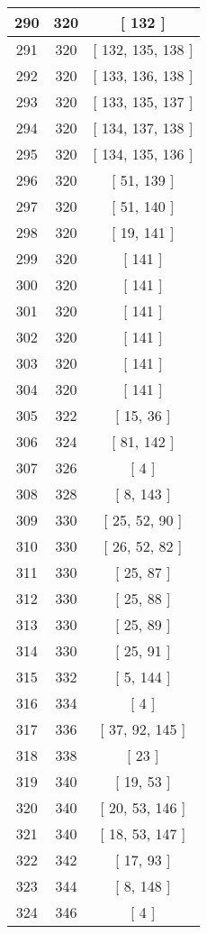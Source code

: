 \begin{center}
\begin{longtable}[H]{|| c c c ||}
\hline
290 & 320 & [ 132 ] \\ 
\hline
291 & 320 & [ 132, 135, 138 ] \\ 
\hline
292 & 320 & [ 133, 136, 138 ] \\ 
\hline
293 & 320 & [ 133, 135, 137 ] \\ 
\hline
294 & 320 & [ 134, 137, 138 ] \\ 
\hline
295 & 320 & [ 134, 135, 136 ] \\ 
\hline
296 & 320 & [ 51, 139 ] \\ 
\hline
297 & 320 & [ 51, 140 ] \\ 
\hline
298 & 320 & [ 19, 141 ] \\ 
\hline
299 & 320 & [ 141 ] \\ 
\hline
300 & 320 & [ 141 ] \\ 
\hline
301 & 320 & [ 141 ] \\ 
\hline
302 & 320 & [ 141 ] \\ 
\hline
303 & 320 & [ 141 ] \\ 
\hline
304 & 320 & [ 141 ] \\ 
\hline
305 & 322 & [ 15, 36 ] \\ 
\hline
306 & 324 & [ 81, 142 ] \\ 
\hline
307 & 326 & [ 4 ] \\ 
\hline
308 & 328 & [ 8, 143 ] \\ 
\hline
309 & 330 & [ 25, 52, 90 ] \\ 
\hline
310 & 330 & [ 26, 52, 82 ] \\ 
\hline
311 & 330 & [ 25, 87 ] \\ 
\hline
312 & 330 & [ 25, 88 ] \\ 
\hline
313 & 330 & [ 25, 89 ] \\ 
\hline
314 & 330 & [ 25, 91 ] \\ 
\hline
315 & 332 & [ 5, 144 ] \\ 
\hline
316 & 334 & [ 4 ] \\ 
\hline
317 & 336 & [ 37, 92, 145 ] \\ 
\hline
318 & 338 & [ 23 ] \\ 
\hline
319 & 340 & [ 19, 53 ] \\ 
\hline
320 & 340 & [ 20, 53, 146 ] \\ 
\hline
321 & 340 & [ 18, 53, 147 ] \\ 
\hline
322 & 342 & [ 17, 93 ] \\ 
\hline
323 & 344 & [ 8, 148 ] \\ 
\hline
324 & 346 & [ 4 ] \\ 

\end{longtable}
\end{center}

